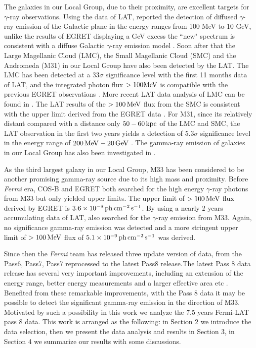 \documentclass[useAMS,usenatbib,referee]{mn2e}
\begin{document}
The galaxies in our Local Group, due to their proximity, are excellent targets for $\gamma$-ray observations. Using the data of LAT, \citep{aaa+2009b} reported the detection of diffused $\gamma$-ray emission of the Galactic plane in the energy ranges from 100 MeV to 10 GeV, unlike the results of EGRET displaying a GeV excess \citep{hbc+1997} the ``new" spectrum is consistent with a diffuse Galactic $\gamma$-ray emission model \citep[see][for the details of the model]{aaa+2009b}. Soon after that the Large Magellanic Cloud (LMC), the Small Magellanic Cloud (SMC) and the Andromeda (M31) in our Local Group have also been detected by the LAT. The LMC has been detected at a 33$\sigma$ significance level with the first 11 months data of LAT, and the integrated photon flux $>100{\rm MeV}$ \citep{aaa+2010a} is compatible with the previous EGRET observations \citep{sbd+1992}. More recent LAT data analysis of LMC can be found in \citet{aaa+2016}. The LAT results of the $>100\,{\rm MeV}$ flux from the SMC \citep{aaa+2010b} is consistent with the upper limit derived from the EGRET data \citep{sbd+1993}. For M31, since its relatively distant \citep[about $800\,{\rm kpc}$, see][]{Holland1998,Walker2003} compared with a distance only $50-60\,{\rm kpc}$ of the LMC and SMC, the LAT observation in the first two years yields a detection of $5.3\sigma$ significance level in the energy range of $200\,{\rm MeV}-20\,{\rm GeV}$ \citep{aaa+2010c}. The gamma-ray emission of galaxies in our Local Group has also been investigated in \citet{lw2011}.

As the third largest galaxy in our Local Group, M33 has been considered to be another promising gamma-ray source due to its high mass and proximity. Before {\it Fermi} era, COS-B \citep{pmb+1981} and EGRET \citep{hbb+1999} both  searched for the high energy $\gamma$-ray photons from M33 but only yielded upper limits. The upper limit of $>100\,{\rm MeV}$ flux derived by EGRET is $3.6\times 10^{-8}\,{\rm ph\,cm^{-2}\,s^{-1}}$. By using a nearly 2 years accumulating data of LAT, \citet{aaa+2010c} also  searched for the $\gamma$-ray emission from M33. Again, no significance gamma-ray emission was detected and a more stringent upper limit of $>100\,{\rm MeV}$ flux of $5.1\times 10^{-9}\,{\rm ph\,cm^{-2}\,s^{-1}}$ was derived.

Since then the {\it Fermi} team has released three update version of data, from the Pass6, Pass7, Pass7 reprocessed to the latest Pass8 release.The latest Pass 8 data release has several very important improvements, including an extension of the energy range, better energy measurements and a larger effective area etc \citep{aab+2013}. Benefited from these remarkable improvements, with the Pass 8 data it may be possible to detect the significant gamma-ray emission in the direction of M33. Motivated by such a possibility in this work we analyze the 7.5 years Fermi-LAT pass 8 data. This work is arranged as the following: in Section 2 we introduce the data selection, then we present the data analysis and results in Section 3, in Section 4 we summarize our results with some discussions.
\end{document}
